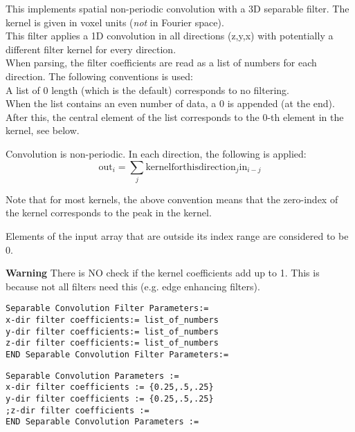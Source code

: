 \documentclass{article}
\newcommand{\tab}{\hspace{5mm}}
\begin{document}
This implements spatial non-periodic convolution with a 3D separable 
filter. The kernel is given in voxel units (\textit{not} in Fourier 
space).\\
This filter applies a 1D convolution in all directions (z,y,x) 
with potentially a different filter kernel for every direction.\\
When parsing, the filter coefficients are read as a list of numbers 
for each direction. The following conventions is used:\\
{\textbullet}\tab 
A list of 0 length (which is the default) corresponds to no filtering.\\
{\textbullet}\tab When the list contains an even number of data, a 0 is 
appended (at the end).\\
{\textbullet}\tab 
After this, the central element of the list corresponds to the 
0-th element in the kernel, see below.


Convolution is non-periodic. In each direction, the following 
is applied: 
\[
\mathrm{out}_i = \sum_{j} \mathrm{kernelforthisdirection}_{j} \mathrm{in}_{i-j}
\]

Note that for most kernels, the above convention means that the 
zero-index of the kernel corresponds to the peak in the kernel. 



Elements of the input array that are outside its index range 
are considered to be 0. 


\textbf{Warning} There is NO check if the kernel coefficients add 
up to 1. This is because not all filters need this (e.g. edge 
enhancing filters).

{ 
}
\begin{verbatim}
Separable Convolution Filter Parameters:=
x-dir filter coefficients:= list_of_numbers
y-dir filter coefficients:= list_of_numbers
z-dir filter coefficients:= list_of_numbers
END Separable Convolution Filter Parameters:=
\end{verbatim}

{ 
}
\begin{verbatim}
Separable Convolution Parameters := 
x-dir filter coefficients := {0.25,.5,.25} 
y-dir filter coefficients := {0.25,.5,.25} 
;z-dir filter coefficients :=
END Separable Convolution Parameters :=
\end{verbatim}

{ 
}
\end{document}
